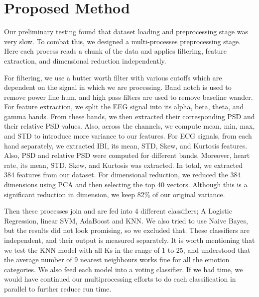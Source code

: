 \section{Proposed Method}
\label{sec:proposed_method}

Our preliminary testing found that dataset loading and preprocessing stage was very slow.
To combat this, we designed a multi-processes preprocessing stage.
Here each process reads a chunk of the data and applies filtering,
feature extraction, and dimensional reduction independently.

For filtering, we use a butter worth filter with various cutoffs which are dependent on the signal in which we are processing.
Band notch is used to remove power line hum, and high pass filters are used to remove
baseline wander.
For feature extraction, we split the EEG signal into its alpha, beta, theta, and gamma bands.
From these bands, we then extracted their corresponding PSD and their relative PSD values. Also, across the channels, we compute mean, min, max, and STD to introduce more variance to our features.
For ECG signals, from each hand separately, we extracted IBI, its mean, STD, Skew, and Kurtosis features. Also, PSD and relative PSD were computed for different bands. Moreover, heart rate, its mean, STD, Skew, and Kurtosis was extracted. 
In total, we extracted 384 features from our dataset.
For dimensional reduction, we reduced the 384 dimensions using PCA
and then selecting the top 40 vectors.
Although this is a significant reduction in dimension, we keep 82\% of our
original variance.

Then these processes join and are fed into 4 different classifiers;
A Logistic Regression, linear SVM, AdaBoost and KNN.
We also tried to use Naive Bayes, but the results did not look promising, so we excluded that.
These classifiers are independent, and their output is measured separately. 
It is worth mentioning that we test the KNN model with all Ks in the range of 1 to 25, and
understood that the average number of 9 nearest neighbours works fine for all the emotion categories.
We also feed each model into a voting classifier.
If we had time, we would have continued our multiprocessing efforts to do each
classification in parallel to further reduce run time.